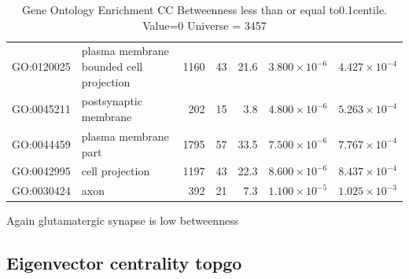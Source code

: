 \begin{table}[ht]
\begin{tabular}{llrrrrr}
  GO:0120025 & plasma membrane bounded cell projection & 1160 & 43 & 21.6 & $3.800 \times 10^{-6}$ & $4.427 \times 10^{-4}$ \\ 
  GO:0045211 & postsynaptic membrane & 202 & 15 & 3.8 & $4.800 \times 10^{-6}$ & $5.263 \times 10^{-4}$ \\ 
  GO:0044459 & plasma membrane part & 1795 & 57 & 33.5 & $7.500 \times 10^{-6}$ & $7.767 \times 10^{-4}$ \\ 
  GO:0042995 & cell projection & 1197 & 43 & 22.3 & $8.600 \times 10^{-6}$ & $8.437 \times 10^{-4}$ \\ 
  GO:0030424 & axon & 392 & 21 & 7.3 & $1.100 \times 10^{-5}$ & $1.025 \times 10^{-3}$ \\ 
   \hline
\end{tabular}
\caption{Gene Ontology Enrichment CC Betweenness  less than or equal to0.1centile.   Value=0 Universe = 3457} 
\label{tab:Gene Ontology Enrichment CC Betweenness  less than or equal to0.1centile.   Value=0 Universe = 3457}
\end{table}

Again glutamatergic synapse is low betweenness


\subsection{Eigenvector centrality topgo}

